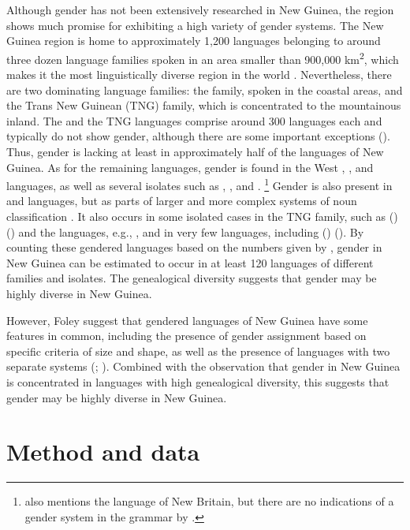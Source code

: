\documentclass[output=collectionpaper]{langsci/langscibook}
\begin{document}
Although gender has not been extensively researched in New Guinea, the region shows much promise for exhibiting a high variety of gender systems. The New Guinea region is home to approximately 1,200 languages belonging to around three dozen language families spoken in an area smaller than 900,000 km\textsuperscript{2}, which makes it the most linguistically diverse region in the world \citep[357]{Foley2000}. Nevertheless, there are two dominating language families: the  family, spoken in the coastal areas, and the Trans New Guinean (TNG) family, which is concentrated to the mountainous inland. The  and the TNG languages comprise around 300 languages each and typically do not show gender, although there are some important exceptions (\citealt[358--363]{Foley2000}). Thus, gender is lacking at least in approximately half of the languages of New Guinea. As for the remaining languages, gender is found in the West , , and  languages, as well as several isolates such as , , and  \citep[371]{Foley2000}.%
\footnote{\citet[371]{Foley2000} also mentions the  language of New Britain, but there are no indications of a gender system in the grammar by \citet{Tharp1996}.} %
Gender is also present in  and  languages, but as parts of larger and more complex systems of noun classification \citep[371]{Foley2000}. It also occurs in some isolated cases in the TNG family, such as  () (\citealt{Svaerd2013}) and the  languages, e.g.,  \citep{Fedden2011}, and in very few  languages, including  () (\citealt{Mosel2000}). By counting these gendered languages based on the numbers given by \citet{Foley2000}, gender in New Guinea can be estimated to occur in at least 120 languages of different families and isolates. The genealogical diversity suggests that gender may be highly diverse in New Guinea.

However, Foley suggest that gendered languages of New Guinea have some features in common, including the presence of gender assignment based on specific criteria of size and shape, as well as the presence of languages with two separate systems (\citealt{Foley2000}; \citealt[8--9]{Svaerd2015}). Combined with the observation that gender in New Guinea is concentrated in languages with high genealogical diversity, this suggests that gender may be highly diverse in New Guinea.

\section{Method and data}
\label{sec:Svard:2}
\end{document}
